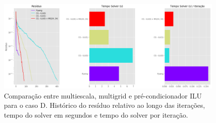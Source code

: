 
\begin{figure}[!htbp]
\label{fig:casoE_2}
\centering
\includegraphics[width=\textwidth]{chap08/figs/casoE_2.png}
\caption{Comparação entre multiescala, multigrid e pré-condicionador ILU para o caso D. Histórico do resíduo relativo ao longo das iterações, tempo do solver em segundos e tempo do solver por iteração. }
\end{figure}
